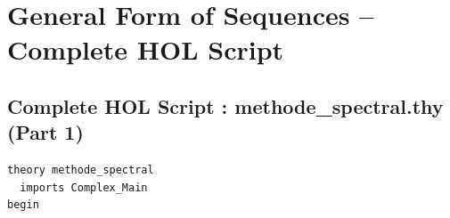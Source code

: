 \documentclass[a4paper,11pt]{article}
\begin{document}
\newpage
\section{General Form of Sequences -- Complete HOL Script}

\subsection{Complete HOL Script : methode\_spectral.thy (Part 1)}

\begin{holcode}[title={\textcolor{white}{File: methode\_spectral.thy -- Part 1/4}}]
\begin{lstlisting}
theory methode_spectral
  imports Complex_Main
begin


\end{lstlisting}
\end{holcode}
\end{document}

